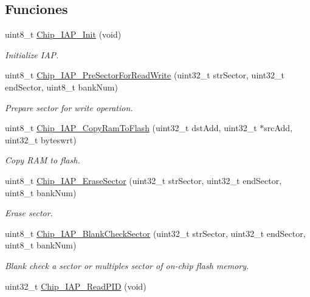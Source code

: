 \subsection*{Funciones}
\begin{DoxyCompactItemize}
\item 
uint8\+\_\+t \hyperlink{group___i_a_p__18_x_x__43_x_x_ga85baff5c83b664045cde6e27c56f98a1}{Chip\+\_\+\+I\+A\+P\+\_\+\+Init} (void)
\begin{DoxyCompactList}\small\item\em Initialize I\+AP. \end{DoxyCompactList}\item 
uint8\+\_\+t \hyperlink{group___i_a_p__18_x_x__43_x_x_ga2848906d7dd201adfe74ee0501963f66}{Chip\+\_\+\+I\+A\+P\+\_\+\+Pre\+Sector\+For\+Read\+Write} (uint32\+\_\+t str\+Sector, uint32\+\_\+t end\+Sector, uint8\+\_\+t bank\+Num)
\begin{DoxyCompactList}\small\item\em Prepare sector for write operation. \end{DoxyCompactList}\item 
uint8\+\_\+t \hyperlink{group___i_a_p__18_x_x__43_x_x_ga71cb8cde86dc344b05219cdf1ecee638}{Chip\+\_\+\+I\+A\+P\+\_\+\+Copy\+Ram\+To\+Flash} (uint32\+\_\+t dst\+Add, uint32\+\_\+t $\ast$src\+Add, uint32\+\_\+t byteswrt)
\begin{DoxyCompactList}\small\item\em Copy R\+AM to flash. \end{DoxyCompactList}\item 
uint8\+\_\+t \hyperlink{group___i_a_p__18_x_x__43_x_x_ga6f5e81e121da7eb32a50cd205ca3358f}{Chip\+\_\+\+I\+A\+P\+\_\+\+Erase\+Sector} (uint32\+\_\+t str\+Sector, uint32\+\_\+t end\+Sector, uint8\+\_\+t bank\+Num)
\begin{DoxyCompactList}\small\item\em Erase sector. \end{DoxyCompactList}\item 
uint8\+\_\+t \hyperlink{group___i_a_p__18_x_x__43_x_x_gac740e0af8946c1bbfc04fbbb1c9b95e3}{Chip\+\_\+\+I\+A\+P\+\_\+\+Blank\+Check\+Sector} (uint32\+\_\+t str\+Sector, uint32\+\_\+t end\+Sector, uint8\+\_\+t bank\+Num)
\begin{DoxyCompactList}\small\item\em Blank check a sector or multiples sector of on-\/chip flash memory. \end{DoxyCompactList}\item 
uint32\+\_\+t \hyperlink{group___i_a_p__18_x_x__43_x_x_gaa4b90551649db0627dc195acfc834cbe}{Chip\+\_\+\+I\+A\+P\+\_\+\+Read\+P\+ID} (void)

\end{DoxyCompactItemize}
